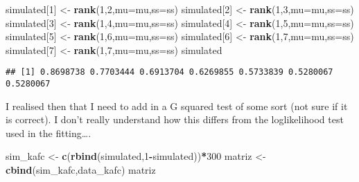 \documentclass[]{article}
\newenvironment{Shaded}{\begin{snugshade}}{\end{snugshade}}
\newcommand{\KeywordTok}[1]{\textcolor[rgb]{0.13,0.29,0.53}{\textbf{#1}}}
\newcommand{\DataTypeTok}[1]{\textcolor[rgb]{0.13,0.29,0.53}{#1}}
\newcommand{\DecValTok}[1]{\textcolor[rgb]{0.00,0.00,0.81}{#1}}
\newcommand{\StringTok}[1]{\textcolor[rgb]{0.31,0.60,0.02}{#1}}
\newcommand{\OperatorTok}[1]{\textcolor[rgb]{0.81,0.36,0.00}{\textbf{#1}}}
\newcommand{\NormalTok}[1]{#1}
\begin{document}
\begin{Shaded}
\begin{Highlighting}[]
\NormalTok{simulated[}\DecValTok{1}\NormalTok{]  <-}\StringTok{ }\KeywordTok{rank}\NormalTok{(}\DecValTok{1}\NormalTok{,}\DecValTok{2}\NormalTok{,}\DataTypeTok{mu=}\NormalTok{mu,}\DataTypeTok{ss=}\NormalTok{ss)    }
\NormalTok{simulated[}\DecValTok{2}\NormalTok{]  <-}\StringTok{ }\KeywordTok{rank}\NormalTok{(}\DecValTok{1}\NormalTok{,}\DecValTok{3}\NormalTok{,}\DataTypeTok{mu=}\NormalTok{mu,}\DataTypeTok{ss=}\NormalTok{ss)}
\NormalTok{simulated[}\DecValTok{3}\NormalTok{]  <-}\StringTok{ }\KeywordTok{rank}\NormalTok{(}\DecValTok{1}\NormalTok{,}\DecValTok{4}\NormalTok{,}\DataTypeTok{mu=}\NormalTok{mu,}\DataTypeTok{ss=}\NormalTok{ss)}
\NormalTok{simulated[}\DecValTok{4}\NormalTok{]  <-}\StringTok{ }\KeywordTok{rank}\NormalTok{(}\DecValTok{1}\NormalTok{,}\DecValTok{5}\NormalTok{,}\DataTypeTok{mu=}\NormalTok{mu,}\DataTypeTok{ss=}\NormalTok{ss)}
\NormalTok{simulated[}\DecValTok{5}\NormalTok{] <-}\StringTok{ }\KeywordTok{rank}\NormalTok{(}\DecValTok{1}\NormalTok{,}\DecValTok{6}\NormalTok{,}\DataTypeTok{mu=}\NormalTok{mu,}\DataTypeTok{ss=}\NormalTok{ss)}
\NormalTok{simulated[}\DecValTok{6}\NormalTok{] <-}\StringTok{ }\KeywordTok{rank}\NormalTok{(}\DecValTok{1}\NormalTok{,}\DecValTok{7}\NormalTok{,}\DataTypeTok{mu=}\NormalTok{mu,}\DataTypeTok{ss=}\NormalTok{ss)}
\NormalTok{simulated[}\DecValTok{7}\NormalTok{] <-}\StringTok{ }\KeywordTok{rank}\NormalTok{(}\DecValTok{1}\NormalTok{,}\DecValTok{7}\NormalTok{,}\DataTypeTok{mu=}\NormalTok{mu,}\DataTypeTok{ss=}\NormalTok{ss)}
\NormalTok{simulated}
\end{Highlighting}
\end{Shaded}

\begin{verbatim}
## [1] 0.8698738 0.7703444 0.6913704 0.6269855 0.5733839 0.5280067 0.5280067
\end{verbatim}

I realised then that I need to add in a G squared test of some sort (not
sure if it is correct). I don't really understand how this differs from
the loglikelihood test used in the fitting\ldots{}.

\begin{Shaded}
\begin{Highlighting}[]
\NormalTok{sim_kafc <-}\StringTok{ }\KeywordTok{c}\NormalTok{(}\KeywordTok{rbind}\NormalTok{(simulated,}\DecValTok{1}\OperatorTok{-}\NormalTok{simulated))}\OperatorTok{*}\DecValTok{300}
\NormalTok{matriz <-}\StringTok{ }\KeywordTok{cbind}\NormalTok{(sim_kafc,data_kafc)}
\NormalTok{matriz}
\end{Highlighting}
\end{Shaded}
\end{document}
